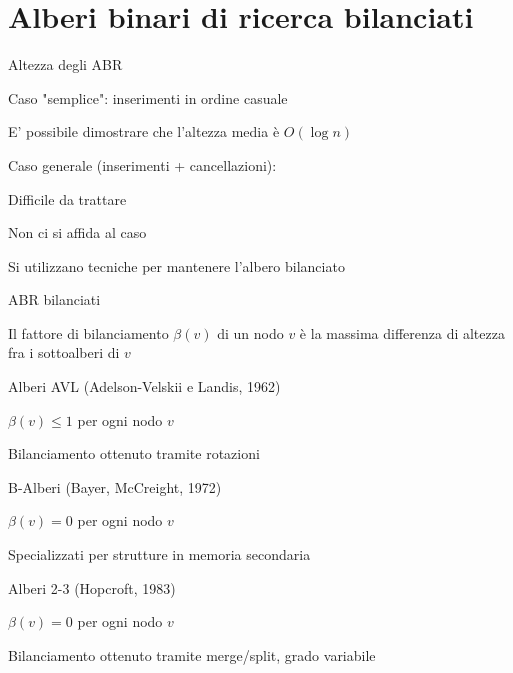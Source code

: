 \section{Alberi binari di ricerca bilanciati}

\begin{frame}{Altezza degli ABR}

\BIL
\item Caso "semplice": inserimenti in ordine casuale
  \BI
  \item E' possibile dimostrare che l'altezza media è $O(\log n)$
  \EI
\item Caso generale (inserimenti + cancellazioni): 
  \BI
  \item Difficile da trattare
  \EI
\EIL

\BIL
\item Non ci si affida al caso
\item Si utilizzano tecniche per mantenere l'albero bilanciato
\EIL

\end{frame}

\begin{frame}{ABR bilanciati}

\begin{myboxtitle}
Il \alert{fattore di bilanciamento} $\beta(v)$ di un nodo $v$ è la massima differenza di altezza fra i sottoalberi di $v$
\end{myboxtitle}

\BIL
\item \alert{Alberi AVL} (Adelson-Velskii e Landis, 1962)
\BI
\item $\beta(v) \leq 1$  per ogni nodo $v$
\item Bilanciamento ottenuto tramite rotazioni
\EI
\item \alert{B-Alberi} (Bayer, McCreight,  1972)
\BI
\item $\beta(v) = 0$ per ogni nodo $v$
\item  Specializzati per strutture in memoria secondaria
\EI
\item \alert{Alberi 2-3} (Hopcroft, 1983)
\BI
\item  $\beta(v) = 0$ per ogni nodo $v$
\item Bilanciamento ottenuto tramite merge/split, grado variabile
\EI
\EIL

\end{frame}

